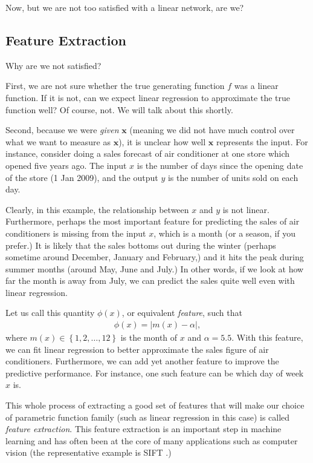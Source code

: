 \documentclass{report}
\newcommand{\vect}[1]{\mathbf{#1}}
\newcommand{\vx}[0]{\vect{x}}
\begin{document}
Now, but we are not too satisfied with a linear network, are we?

\subsection{Feature Extraction}
\label{sec:feature_extraction}

Why are we not satisfied?

First, we are not sure whether the true generating function $f$ was a linear
function. If it is not, can we expect linear regression to approximate the true
function well? Of course, not. We will talk about this shortly.

Second, because we were {\em given} $\vx$ (meaning we did not have much control
over what we want to measure as $\vx$), it is unclear how well $\vx$ represents
the input. For instance, consider doing a sales forecast of air conditioner at
one store which opened five years ago. The input $x$ is the number of days since
the opening date of the store (1 Jan 2009), and the output $y$ is the number of
units sold on each day.

Clearly, in this example, the relationship between $x$ and $y$ is not linear.
Furthermore, perhaps the most important feature for predicting the sales of air
conditioners is missing from the input $x$, which is a month (or a season, if
you prefer.) It is likely that the sales bottoms out during the winter (perhaps
sometime around December, January and February,) and it hits the peak during
summer months (around May, June and July.) In other words, if we look at how far
the month is away from July, we can predict the sales quite well even with 
linear regression.

Let us call this quantity $\phi(x)$, or equivalent {\em feature}, such that
\begin{align}
    \label{eq:feat_month}
    \phi(x) = \left| m(x) - \alpha \right|,
\end{align}
where $m(x) \in \left\{ 1,2,\ldots,12\right\}$ is the month of $x$ and
$\alpha=5.5$.  With this
feature, we can fit linear regression to better approximate the sales figure of
air conditioners. Furthermore, we can add yet another feature to improve the
predictive performance. For instance, one such feature can be which day of week
$x$ is. 

This whole process of extracting a good set of features that will make our
choice of parametric function family (such as linear regression in this case) is
called {\em feature extraction}. This feature extraction is an important step in
machine learning and has often been at the core of many applications such as
computer vision (the representative example is SIFT \citep{lowe1999object}.)
\end{document}
